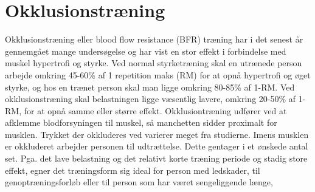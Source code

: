 \section{Okklusionstræning}
Okklusionstræning eller blood flow resistance (BFR) træning har i det senest år gennemgået mange undersøgelse og har vist en stor effekt i forbindelse med muskel hypertrofi og styrke. Ved normal styrketræning skal en utrænede person arbejde omkring 45-60\% af 1 repetition maks (RM) for at opnå hypertrofi og øget styrke, og hos en trænet person skal man ligge omkring 80-85\% af 1-RM. Ved okklusionstræning skal belastningen ligge væsentlig lavere, omkring 20-50\% af 1-RM, for at opnå samme eller større effekt. 
Okklusiontræning udfører ved at afklemme blodforsyningen til muskel, så manchetten sidder proximalt for musklen. Trykket der okkluderes ved varierer meget fra studierne. Imens musklen er okkluderet arbejder personen til udtrættelse. Dette gentager i et ønskede antal set. 
Pga. det lave belastning og det relativt korte træning periode og stadig store effekt, egner det træningsform sig ideal for person med ledskader, til genoptræningsforløb eller til person som har været sengeliggende længe, 









